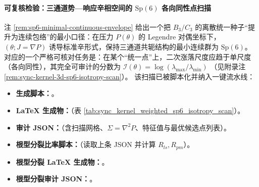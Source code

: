 \paragraph{可复核检验：三通道势—响应辛相空间的 \texorpdfstring{$\mathrm{Sp}(6)$}{Sp(6)} 各向同性点扫描}
注 \ref{rem:sp6-minimal-continuous-envelope} 给出一个把 \(B_3/C_3\) 的离散统一种子“提升为连续包络”的最小口径：在压力 \(P(\theta)\) 的 Legendre 对偶坐标下，
\((\theta;J=\nabla P)\) 诱导标准辛形式，保持三通道共轭结构的最小连续群为 \(\mathrm{Sp}(6)\)。
对应的一个严格可核对任务是：在某个“统一点”上，二次涨落尺度应趋于单尺度（各向同性），其完全可审计的分数为
\(
\mathcal{I}(\theta)=\log(\lambda_{\max}/\lambda_{\min})
\)
（见附录注 \ref{rem:sync-kernel-3d-sp6-isotropy-scan}）。
该扫描已被脚本化并纳入一键流水线：
\begin{itemize}
  \item \textbf{生成脚本：}\texttt{}。
  \item \textbf{LaTeX 生成物：}\texttt{}（表 \ref{tab:sync_kernel_weighted_sp6_isotropy_scan}）。
  \item \textbf{审计 JSON：}\texttt{}（含扫描网格、\(\Sigma=\nabla^2P\)、特征值与最优候选点列表）。
  \item \textbf{根型分裂比率脚本：}\texttt{}（读取上条 JSON 并计算 \(R_{ls},R_{pm}\)）。
  \item \textbf{根型分裂 LaTeX 生成物：}\texttt{}。
  \item \textbf{根型分裂审计 JSON：}\texttt{}。
\end{itemize}

